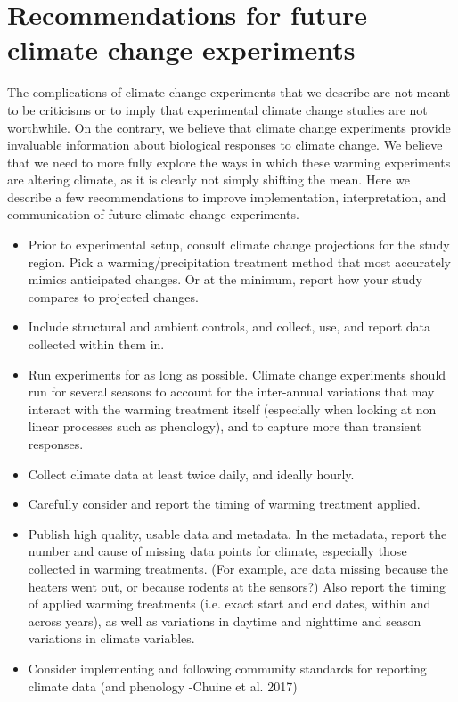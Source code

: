 \documentclass{article}
\begin{document}
\section* {Recommendations for future climate change experiments}
 \par The complications of climate change experiments that  we describe are not meant to be criticisms or to imply that experimental climate change studies are not worthwhile. On the contrary, we believe that climate change experiments provide invaluable information about biological responses to climate change.
 We believe that we need to more fully explore the ways in which these warming experiments are altering climate, as it is clearly not simply shifting the mean. Here we describe a few recommendations to improve implementation, interpretation, and communication of future climate change experiments.
\begin{itemize}

\item Prior to experimental setup, consult climate change projections for the study region.  Pick a warming/precipitation treatment method that most accurately mimics anticipated changes. Or at the minimum, report how your study compares to projected changes. 
\item Include structural and ambient controls, and collect, use, and report data collected within them in. 
\item Run experiments for as long as possible. Climate change experiments should run for several seasons to account for the inter-annual variations that may interact with the warming treatment itself (especially when looking at non linear processes such as phenology), and to capture more than transient responses.
 \item Collect climate data at least twice daily, and ideally hourly. 
\item Carefully consider and report the timing of warming treatment applied.
 \item Publish high quality, usable data and metadata. In the metadata, report the number and cause of missing data points for climate, especially those collected in warming treatments. (For example, are data missing because the heaters went out, or because rodents at the sensors?) Also report the timing of applied warming treatments (i.e. exact start and end dates, within and across years), as well as variations in daytime and nighttime and season variations in climate variables. 
\item Consider implementing and following community standards for reporting climate data (and phenology -Chuine et al. 2017) %

 \end{itemize}
\end{document}
